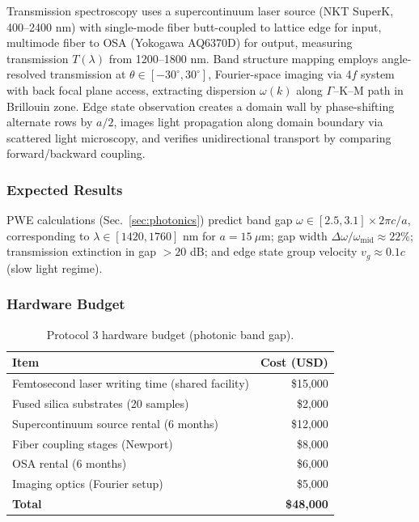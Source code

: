 Transmission spectroscopy uses a supercontinuum laser source (NKT SuperK, 400--2400 nm) with single-mode fiber butt-coupled to lattice edge for input, multimode fiber to OSA (Yokogawa AQ6370D) for output, measuring transmission $T(\lambda)$ from 1200--1800 nm. Band structure mapping employs angle-resolved transmission at $\theta \in [-30^\circ, 30^\circ]$, Fourier-space imaging via 4$f$ system with back focal plane access, extracting dispersion $\omega(k)$ along $\Gamma$--K--M path in Brillouin zone. Edge state observation creates a domain wall by phase-shifting alternate rows by $a/2$, images light propagation along domain boundary via scattered light microscopy, and verifies unidirectional transport by comparing forward/backward coupling.

\subsubsection{Expected Results}

PWE calculations (Sec.~\ref{sec:photonics}) predict band gap $\omega \in [2.5, 3.1] \times 2\pi c/a$, corresponding to $\lambda \in [1420, 1760]$ nm for $a = 15~\mu$m; gap width $\Delta\omega / \omega_{\mathrm{mid}} \approx 22\%$; transmission extinction in gap $> 20$ dB; and edge state group velocity $v_g \approx 0.1c$ (slow light regime).

\subsubsection{Hardware Budget}

\begin{table}[h]
\caption{Protocol 3 hardware budget (photonic band gap).}
\label{tab:budget_p3}
\begin{ruledtabular}
\begin{tabular}{lr}
\textbf{Item} & \textbf{Cost (USD)} \\
\hline
Femtosecond laser writing time (shared facility) & \$15,000 \\
Fused silica substrates (20 samples) & \$2,000 \\
Supercontinuum source rental (6 months) & \$12,000 \\
Fiber coupling stages (Newport) & \$8,000 \\
OSA rental (6 months) & \$6,000 \\
Imaging optics (Fourier setup) & \$5,000 \\
\hline
\textbf{Total} & \textbf{\$48,000} \\
\end{tabular}
\end{ruledtabular}
\end{table}

